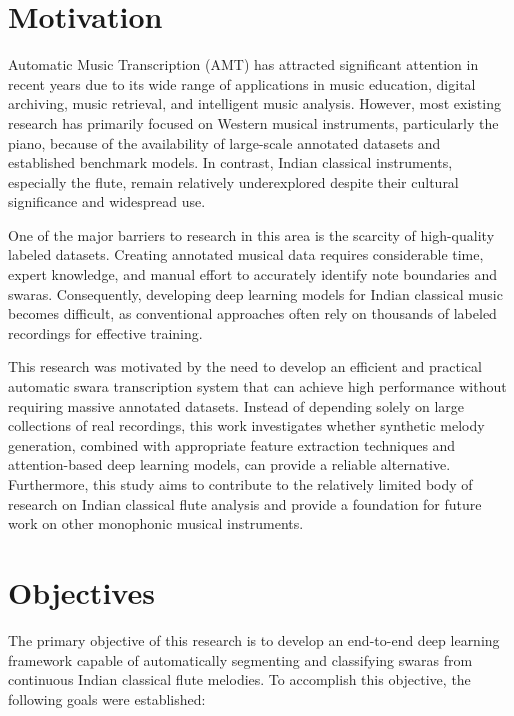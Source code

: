 \section{Motivation}
\label{sec:motivation}

Automatic Music Transcription (AMT) has attracted significant attention in recent years due to its wide range of applications in music education, digital archiving, music retrieval, and intelligent music analysis. However, most existing research has primarily focused on Western musical instruments, particularly the piano, because of the availability of large-scale annotated datasets and established benchmark models. In contrast, Indian classical instruments, especially the flute, remain relatively underexplored despite their cultural significance and widespread use.

One of the major barriers to research in this area is the scarcity of high-quality labeled datasets. Creating annotated musical data requires considerable time, expert knowledge, and manual effort to accurately identify note boundaries and swaras. Consequently, developing deep learning models for Indian classical music becomes difficult, as conventional approaches often rely on thousands of labeled recordings for effective training.

This research was motivated by the need to develop an efficient and practical automatic swara transcription system that can achieve high performance without requiring massive annotated datasets. Instead of depending solely on large collections of real recordings, this work investigates whether synthetic melody generation, combined with appropriate feature extraction techniques and attention-based deep learning models, can provide a reliable alternative. Furthermore, this study aims to contribute to the relatively limited body of research on Indian classical flute analysis and provide a foundation for future work on other monophonic musical instruments.

\section{Objectives}
\label{sec:objectives}

The primary objective of this research is to develop an end-to-end deep learning framework capable of automatically segmenting and classifying swaras from continuous Indian classical flute melodies. To accomplish this objective, the following goals were established:

